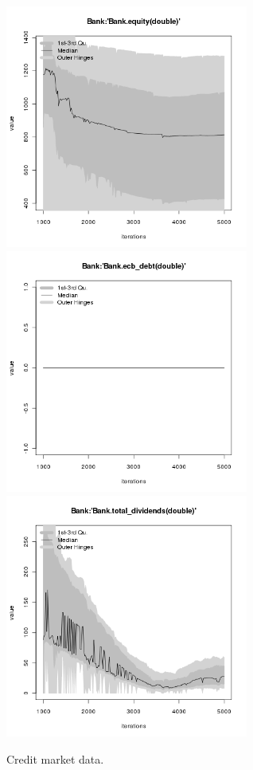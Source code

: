 \begin{figure}[H!]
\begin{minipage}{17cm}
\includegraphics[width=8cm]{./png/tax_0.10/Bank-equity.png}\\
\includegraphics[width=8cm]{./png/tax_0.10/Bank-ecb_debt.png}
\includegraphics[width=8cm]{./png/tax_0.10/Bank-total_dividends.png}
\end{minipage}
\caption{Credit market data.}
\label{Figure: Credit Market}
\end{figure}

%
